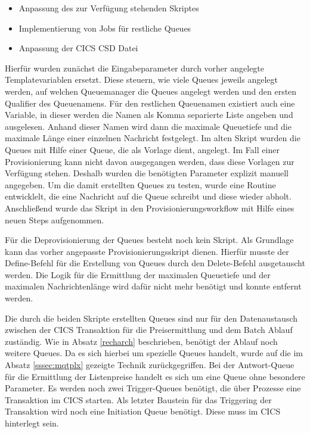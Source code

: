 \begin{samepage}
\begin{itemize}
\item Anpassung des zur Verfügung stehenden Skriptes
\item Implementierung von Jobs für restliche Queues
\item Anpassung der CICS CSD Datei
\end{itemize}
\end{samepage}

Hierfür wurden zunächst die Eingabeparameter durch vorher angelegte Templatevariablen ersetzt.
Diese steuern, wie viele Queues jeweils angelegt werden, auf welchen Queuemanager die Queues angelegt werden und den ersten Qualifier des Queuenamens.
Für den restlichen Queuenamen existiert auch eine Variable, in dieser werden die Namen als Komma separierte Liste angeben und ausgelesen.
Anhand dieser Namen wird dann die maximale Queuetiefe und die maximale Länge einer einzelnen Nachricht festgelegt.
Im alten Skript wurden die Queues mit Hilfe einer Queue, die als Vorlage dient, angelegt.
Im Fall einer Provisionierung kann nicht davon ausgegangen werden, dass diese Vorlagen zur Verfügung stehen.
Deshalb wurden die benötigten Parameter explizit manuell angegeben.
Um die damit erstellten Queues zu testen, wurde eine Routine entwicklelt, die eine Nachricht auf die Queue schreibt und diese wieder abholt.
Anschließend wurde das Skript in den Provisionierungsworkflow mit Hilfe eines neuen Steps aufgenommen.

Für die Deprovisionierung der Queues besteht noch kein Skript.
Als Grundlage kann das vorher angepasste Provisionierungsskript dienen.
Hierfür musste der \glqq Define\grqq-Befehl für die Erstellung von Queues durch den \glqq Delete\grqq-Befehl ausgetauscht werden.
Die Logik für die Ermittlung der maximalen Queuetiefe und der maximalen Nachrichtenlänge wird dafür nicht mehr benötigt und konnte entfernt werden.

Die durch die beiden Skripte erstellten Queues sind nur für den Datenaustausch zwischen der CICS Transaktion für die Preisermittlung und dem Batch Ablauf zuständig.
Wie in Absatz \ref{recharch} beschrieben, benötigt der Ablauf noch weitere Queues.
Da es sich hierbei um spezielle Queues handelt, wurde auf die im Absatz \ref{sssec:mqtplx} gezeigte Technik zurückgegriffen.
Bei der Antwort-Queue für die Ermittlung der Listenpreise handelt es sich um eine Queue ohne besondere Parameter.
Es werden noch zwei Trigger-Queues benötigt, die über Prozesse eine Transaktion im CICS starten.
Als letzter Baustein für das Triggering der Transaktion wird noch eine Initiation Queue benötigt.
Diese muss im CICS hinterlegt sein.

